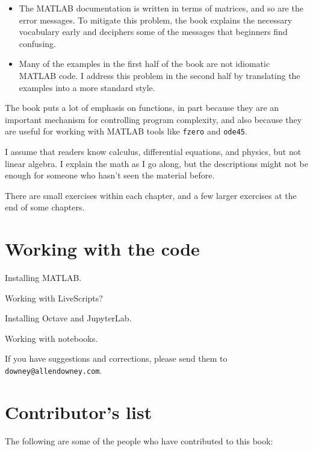 \documentclass[
]{book}
\begin{document}
\begin{itemize}

\item The MATLAB documentation is written in terms of matrices,
and so are the error messages.
To mitigate this problem, the book explains the necessary
vocabulary early and deciphers some of the messages that
beginners find confusing.

\item Many of the examples in the first half of the book are
not idiomatic MATLAB code.  I address this problem in the second
half by translating the examples into a more standard style.

\end{itemize}

The book puts a lot of emphasis on functions, in part because they are
an important mechanism for controlling program complexity, and also
because they are useful for working with MATLAB tools like {\tt fzero}
and {\tt ode45}.

I assume that readers know calculus, differential equations, and
physics, but not linear algebra.  I explain the math as I go along,
but the descriptions might not be enough for someone who hasn't seen
the material before.

There are small exercises within each chapter, and a few larger
exercises at the end of some chapters.

\section{Working with the code}

Installing MATLAB.

Working with LiveScripts?

Installing Octave and JupyterLab.

Working with notebooks.


If you have suggestions and corrections, please send them to
{\tt downey@allendowney.com}.



\newpage

\section*{Contributor's list}

The following are some of the people who have contributed to this
book:
\end{document}
